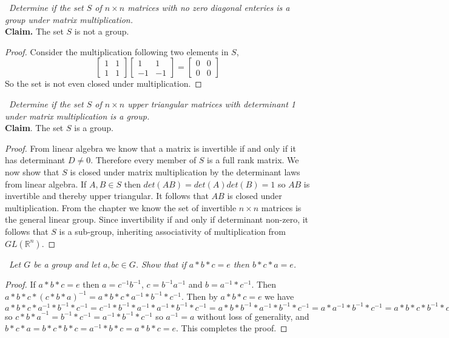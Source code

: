 \documentclass[11pt]{amsart}
\begin{document}
\medskip {}\ \emph{Determine if the set $S$ of $n \times n$ matrices with no zero diagonal enteries is  a group under matrix multiplication.}\\
\textbf{Claim.} The set $S$ is not a group.
\begin{proof}
	Consider the multiplication following two elements in $S$, 
	\begin{equation*}
		\begin{bmatrix}
			1 & 1\\
			1& 1
		\end{bmatrix} \begin{bmatrix}
			1 & 1 \\
			-1 & -1
		\end{bmatrix} = \begin{bmatrix}
			0 & 0 \\
			0 & 0
		\end{bmatrix}
	\end{equation*}
	So the set is not even closed under multiplication.
\end{proof}

\medskip {}\ \emph{Determine if the set $S$ of $n \times n$ upper triangular matrices with determinant 1 under matrix multiplication is a group.}\\
\textbf{Claim}. The set $S$ is a group.
\begin{proof}
	From linear algebra we know that a matrix is invertible if and only if it has determinant $D \neq 0$. Therefore every
	member of $S$ is a full rank matrix. We now show that $S$ is closed under matrix multiplication by the determinant laws from linear algebra. If $A,B \in S$ then $det(AB) = det(A)det(B) = 1$ so $AB$ is invertible and thereby upper triangular. It follows that $AB$ is closed under multiplication. From the chapter we know the set of invertible $n \times n$ matrices is the general linear group. Since invertibility if and only if determinant non-zero, it follows that $S$ is a sub-group, inheriting associativity of multiplication from $GL(\mathbb{R}^n)$.
\end{proof}

\medskip {}\ \emph{Let $G$ be a group and let $a,b c\in G$. Show that if $a*b*c = e$ then $b*c*a = e$.}
\begin{proof}
	If $a*b*c = e$ then $a = c^{-1}b^{-1}$,  $c =b^{-1}a^{-1}$ and $b = a^{-1}*c^{-1}$. Then 
	$a*b*c * {(c*b*a)}^{-1} = a*b*c*a^{-1}*b^{-1}*c^{-1}.$ Then by $a*b*c = e$ we have $ a*b*c*a^{-1}*b^{-1}*c^{-1} = c^{-1}*b^{-1}*a^{-1} *a^{-1}*b^{-1}*c^{-1} = a*b*b^{-1}*a^{-1}*b^{-1}*c^{-1} = a*a^{-1}*b^{-1}*c^{-1} = a*b*c*b^{-1}*c^{-1} = b^{-1}*c^{-1}$ so ${c*b*a}^{-1} = b^{-1}*c^{-1} = a^{-1}*b^{-1}*c^{-1}$ so $a^{-1} = a$ without loss of generality, and $b*c*a = b*c*b*c = a^{-1}*b*c = a*b*c = e.$ This completes the proof.
\end{proof} 
\end{document}
